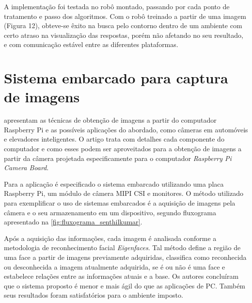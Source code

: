 \documentclass[12pt,oneside,a4paper,chapter=TITLE,section=TITLE,sumario=tradicional]{abntex2}
\begin{document}
\begin{figure}[htb]
\end{figure}

A implementação foi testada no robô montado, passando por cada ponto de tratamento e passo dos algoritmos. Com o robô treinado a partir de uma imagem (Figura 12), obteve-se êxito na busca pelo contorno dentro de um ambiente com certo atraso na visualização das respostas, porém não afetando no seu resultado, e com comunicação estável entre as diferentes plataformas.

\begin{figure}[htb]
\end{figure}

\section{Sistema embarcado para captura de imagens}

 apresentam as técnicas de obtenção de imagens a partir do computador Raspberry Pi e as possíveis aplicações do abordado, como câmeras em automóveis e elevadores inteligentes. O artigo trata com detalhes cada componente do computador e como esses podem ser aproveitados para a obtenção de imagens a partir da câmera projetada especificamente para o computador \textit{Raspberry Pi Camera Board}.

Para a aplicação é especificado o sistema embarcado utilizando uma placa Raspberry Pi, um módulo de câmera MIPI CSI e monitores. O método utilizado para exemplificar o uso de sistemas embarcados é a aquisição de imagens pela câmera e o seu armazenamento em um dispositivo, segundo fluxograma apresentado na \autoref{fig:fluxograma_senthilkumar}.

\begin{figure}[htb]
\end{figure}

Após a aquisição das informações, cada imagem é analisada conforme a metodologia de reconhecimento facial \textit{Eigenfaces}. Tal método define a região de uma face a partir de imagens previamente adquiridas, classifica como reconhecida ou desconhecida a imagem atualmente adquirida, se é ou não é uma face e estabelece relações entre as informações atuais e a base.
Os autores concluíram que o sistema proposto é menor e mais ágil do que as aplicações de PC. Também seus resultados foram satisfatórios para o ambiente imposto.
\end{document}
